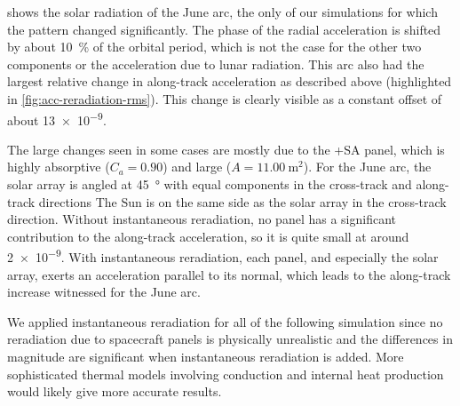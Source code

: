  shows the solar radiation of the June arc, the only of our simulations for which the pattern changed significantly. The phase of the radial acceleration is shifted by about \qty{10}{\percent} of the orbital period, which is not the case for the other two components or the acceleration due to lunar radiation. This arc also had the largest relative change in along-track acceleration as described above (highlighted in \cref{fig:acc-reradiation-rms}). This change is clearly visible as a constant offset of about \qty{13e-9}{\acc}. 

The large changes seen in some cases are mostly due to the +SA panel, which is highly absorptive ($C_a = 0.90$) and large ($A = \qty{11.00}{\m\squared}$). For the June arc, the solar array is angled at \qty{45}{\degree} with equal components in the cross-track and along-track directions The Sun is on the same side as the solar array in the cross-track direction. Without instantaneous reradiation, no panel has a significant contribution to the along-track acceleration, so it is quite small at around \qty{2e-9}{\acc}. With instantaneous reradiation, each panel, and especially the solar array, exerts an acceleration parallel to its normal, which leads to the along-track increase witnessed for the June arc.

We applied instantaneous reradiation for all of the following simulation since no reradiation due to spacecraft panels is physically unrealistic and the differences in magnitude are significant when instantaneous reradiation is added. More sophisticated thermal models involving conduction and internal heat production would likely give more accurate results.











